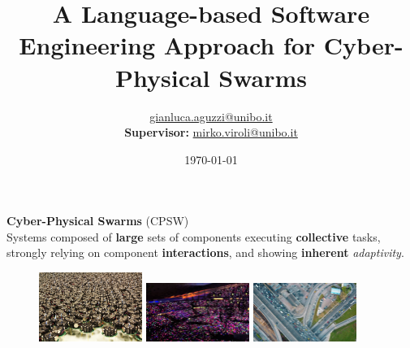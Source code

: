 \documentclass[presentation, 9pt,169]{beamer}\mode<presentation>{\usetheme{AMSBolognaFC}}
\title[A Soft-Eng Approach for CPSWs!]
{A Language-based Software Engineering Approach for Cyber-Physical Swarms}
\author[\sspeaker{G.Aguzzi}]
{\speaker{Gianluca Aguzzi} \href{mailto:gianluca.aguzzi@unibo.it}{gianluca.aguzzi@unibo.it} \\
\textbf{Supervisor:} \speaker{Mirko Viroli} \href{mailto:mirko.viroli@unibo.it}{mirko.viroli@unibo.it}}
\institute[DISI, Univ.\ Bologna]
{%
\textsc{Alma Mater Studiorum} -- Universit{\`a} di Bologna \\[0.1cm]
\textbf{PhD defense}\\[0.15cm]
}
\date[\today]{\today}
\begin{document}

\frame{\titlepage}

\section*{\refname}


\begin{frame}[plain,c]
  \begin{center}
  {\Huge \textbf{Cyber-Physical Swarms} (CPSW)}\\
  {\large Systems composed of \textbf{large} sets of components executing \textbf{collective} tasks, strongly relying on component \textbf{interactions}, and showing \textbf{inherent} \emph{adaptivity}.}\\[0.5cm] 
  \begin{figure}
      \centering
      \includegraphics[width=0.3\textwidth]{img/swarms.jpg}
      \includegraphics[width=0.3\textwidth]{img/coldplay.jpg}
      \includegraphics[width=0.3\textwidth]{img/traffic.jpg} 
  \end{figure}
  \end{center}
\end{frame}
\end{document}
